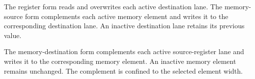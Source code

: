 The register form reads and overwrites each active destination lane. The
memory-source form complements each active memory element and writes it to the
corresponding destination lane. An inactive destination lane retains its
previous value.

The memory-destination form complements each active source-register lane and
writes it to the corresponding memory element. An inactive memory element
remains unchanged. The complement is confined to the selected element width.
